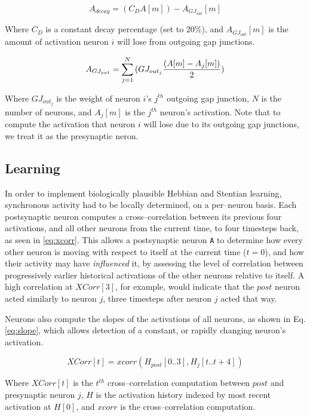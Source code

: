\documentclass[letterpaper]{article}
\begin{document}
\begin{equation}
    A_{decay} = (C_D A[m]) - A_{GJ_{out}}[m]
\end{equation}

Where $C_D$ is a constant decay percentage (set to 20\%), and $A_{GJ_{out}}[m]$ is the amount of activation neuron $i$ will lose from outgoing gap junctions. 


\begin{equation}
    A_{GJ_{out}} = \sum_{j=1}^{N}{(GJ_{out_j} {(A[m] - A_j[m]) \over 2 })}
\end{equation}

Where $GJ_{out_j}$ is the weight of neuron $i$'s $j^{th}$ outgoing gap junction, $N$ is the number of neurons,  and $A_j[m]$ is the $j^{th}$ neuron's activation. Note that to compute the activation that neuron $i$ will lose due to its outgoing gap junctions, we treat it as the presynaptic neron. 

\subsection{Learning}

In order to implement biologically plausible Hebbian and Stentian learning, synchronous activity had to be locally determined, on a per--neuron basis. Each postsynaptic neuron computes a cross--correlation between its previous four activations, and all other neurons from the current time, to four timesteps back, as seen in \ref{eq:xcorr}. This allows a postsynaptic neuron \texttt{A} to determine how every other neuron is moving with respect to itself at the current time ($t=0$), and how their activity may have \textit{influenced} it, by assessing the level of correlation between progressively earlier historical activations of the other neurons relative to itself. A high correlation at $XCorr[3]$, for example, would indicate that the $post$ neuron acted similarly to neuron $j$, three timesteps after neuron $j$ acted that way.

Neurons also compute the slopes of the activations of all neurons, as shown in Eq. \ref{eq:slope}, which allows detection of a constant, or rapidly changing neuron's activation.

\begin{equation}
    \label{eq:xcorr}
    XCorr[t] =  xcorr(H_{post}[0..3], H_{j}[t..t+4])
\end{equation}

Where $XCorr[t]$ is the $t^{th}$ cross--correlation computation between $post$ and presynaptic neuron $j$, $H$ is the activation history indexed by most recent activation at $H[0]$, and $xcorr$ is the cross--correlation computation. 
\end{document}
